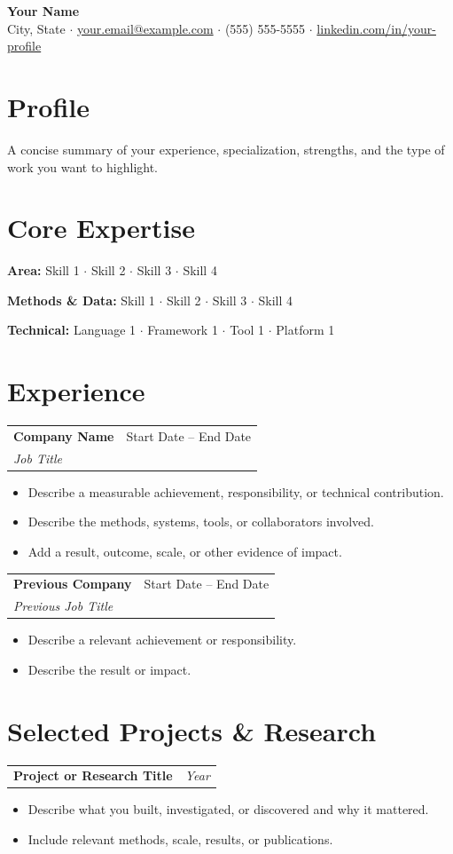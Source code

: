 \documentclass[10pt,letterpaper]{article}
\makeatletter
\newcommand{\heading}[2]{\vspace{2pt}\begin{tabularx}{\textwidth}{@{}Xr@{}}\textbf{#1} & \textit{#2}\end{tabularx}\vspace{-0pt}}
\newcommand{\headingwtitle}[3]{\vspace{2pt}\begin{tabularx}{\textwidth}{@{}Xr@{}}\textbf{#1} & #3\\[1pt] \textit{#2} & \end{tabularx}\vspace{-0pt}}
\makeatother
\begin{document}
\begin{center}
{\LARGE \textbf{Your Name}}\\[3pt]
City, State \quad $\cdot$ \quad
\href{mailto:your.email@example.com}{your.email@example.com} \quad $\cdot$ \quad
(555) 555-5555 \quad $\cdot$ \quad
\href{https://www.linkedin.com/in/your-profile/}{linkedin.com/in/your-profile}
\end{center}
\vspace{-3pt}

\section*{Profile}
A concise summary of your experience, specialization, strengths, and the type of work you want to highlight.

\section*{Core Expertise}
\textbf{Area:} Skill 1 $\cdot$ Skill 2 $\cdot$ Skill 3 $\cdot$ Skill 4

\textbf{Methods \& Data:} Skill 1 $\cdot$ Skill 2 $\cdot$ Skill 3 $\cdot$ Skill 4

\textbf{Technical:} Language 1 $\cdot$ Framework 1 $\cdot$ Tool 1 $\cdot$ Platform 1

\section*{Experience}
\headingwtitle{Company Name}{Job Title}{Start Date -- End Date}
\begin{itemize}
\item Describe a measurable achievement, responsibility, or technical contribution.
\item Describe the methods, systems, tools, or collaborators involved.
\item Add a result, outcome, scale, or other evidence of impact.
\end{itemize}

\headingwtitle{Previous Company}{Previous Job Title}{Start Date -- End Date}
\begin{itemize}
\item Describe a relevant achievement or responsibility.
\item Describe the result or impact.
\end{itemize}

\section*{Selected Projects \& Research}
\heading{Project or Research Title}{Year}
\begin{itemize}
\item Describe what you built, investigated, or discovered and why it mattered.
\item Include relevant methods, scale, results, or publications.
\end{itemize}
\end{document}
